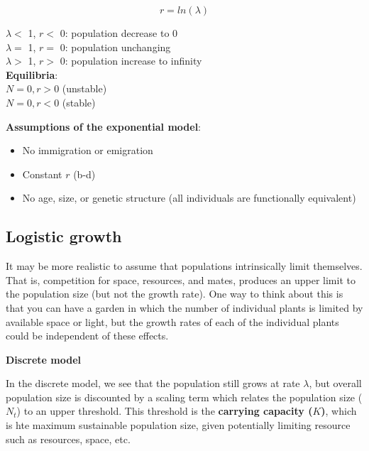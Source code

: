 \documentclass[12pt]{article}
\begin{document}
\begin{equation}
r = ln(\lambda) 
\end{equation}


$\lambda <$ 1, $r <$ 0: population decrease to 0 \\
$\lambda =$ 1, $r =$ 0: population unchanging \\
$\lambda >$ 1, $r >$ 0: population increase to infinity \\




\textbf{Equilibria}:\\

$N = 0, r > 0$ (unstable)\\
$N = 0 , r < 0$ (stable)




\textbf{Assumptions of the exponential model}:

\begin{itemize}
  \item No immigration or emigration
  \item Constant $r$ (b-d)
  \item No age, size, or genetic structure (all individuals are functionally equivalent)
\end{itemize}












\clearpage


\subsection*{Logistic growth}

It may be more realistic to assume that populations intrinsically limit themselves. That is, competition for space, resources, and mates, produces an upper limit to the population size (but not the growth rate). One way to think about this is that you can have a garden in which the number of individual plants is limited by available space or light, but the growth rates of each of the individual plants could be independent of these effects. 



\bigskip

\textbf{Discrete model}

In the discrete model, we see that the population still grows at rate $\lambda$, but overall population size is discounted by a scaling term which relates the population size ($N_t$) to an upper threshold. This threshold is the \textbf{carrying capacity ($K$)}, which is hte maximum sustainable population size, given potentially limiting resource such as resources, space, etc. 
\end{document}

